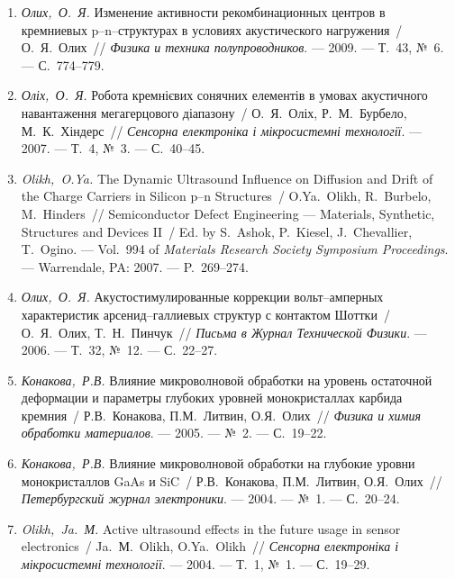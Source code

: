 \begin{enumerate}[label=\arabic*.,leftmargin=1cm,itemindent=0cm]
\item 
\emph{Олих,~О.~Я.} Изменение активности
  рекомбинационных центров в кремниевых
  p--n--структурах в условиях акустического
  нагружения~/ О.~Я.~Олих~// \emph{Физика и
  техника полупроводников}. ---
  2009. ---
  Т.~43, {№}~6. ---
  {С.}~774--779.

\item 
\emph{Оліх,~О.~Я.} Робота кремнієвих сонячних
  елементів в умовах акустичного
  навантаження мегагерцового діапазону~/
  О.~Я.~Оліх, Р.~М.~Бурбело, М.~К.~Хіндерс~//
  \emph{Сенсорна електроніка і
  мікросистемні технології}. ---
  2007. ---
  Т.~4, {№}~3. ---
  {С.}~40--45.

\item 
\emph{Olikh,~O.Ya.} The Dynamic Ultrasound Influence on Diffusion and Drift
  of the Charge Carriers in Silicon p--n Structures~/ O.Ya.~Olikh, R.~Burbelo,
  M.~Hinders~// Semiconductor Defect Engineering --- Materials, Synthetic,
  Structures and Devices II~/ Ed. by S.~Ashok, P.~Kiesel, J.~Chevallier,
  T.~Ogino. ---
  Vol.~994 of \emph{Materials Research Society Symposium
  Proceedings}. ---
  Warrendale, PA: 2007. ---
  P.~269--274.

\item 
\emph{Олих,~О.~Я.} Акустостимулированные
  коррекции вольт--амперных характеристик
  арсенид--галлиевых структур с контактом
  {Ш}оттки~/ О.~Я.~Олих, Т.~Н.~Пинчук~//
  \emph{Письма в Журнал Технической Физики}.
  ---
  2006. ---
  Т.~32, {№}~12. ---
  {С.}~22--27.

\item 
\emph{Конакова,~Р.В.} Влияние микроволновой
  обработки на уровень остаточной
  деформации и параметры глубоких уровней
  монокристаллах карбида кремния~/
  Р.В.~Конакова, П.М.~Литвин, О.Я.~Олих~//
  \emph{Физика и химия обработки материалов}.
  ---
  2005. ---
  {№}~2. ---
  {С.}~19--22.


\item 
\emph{Конакова,~Р.В.} Влияние микроволновой
  обработки на глубокие уровни
  монокристаллов {G}a{A}s и {S}i{C}~/ Р.В.~Конакова,
  П.М.~Литвин, О.Я.~Олих~// \emph{Петербургский
  журнал электроники}. ---
  2004. ---
  {№}~1. ---
  {С.}~20--24.

\item 
\emph{Olikh,~Ja.~М.} Active ultrasound effects in the future usage in
  sensor electronics~/ Ja.~М.~Olikh, O.Ya.~Olikh~// \emph{Сенсорна
  електроніка і мікросистемні технології}.
  ---
  2004. ---
  Т.~1, {№}~1. ---
  {С.}~19--29.


\end{enumerate}
